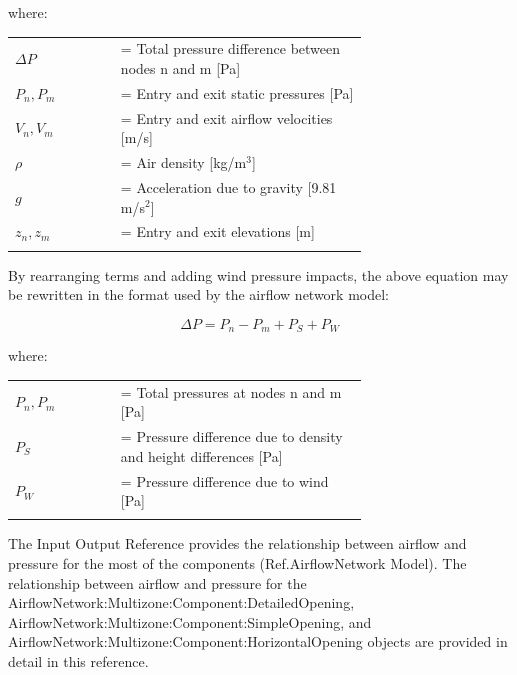 where:

\begin{tabular}{lp{0.7\linewidth}}
\\
$\Delta P$ &= Total pressure difference between nodes n and m [Pa] \\
$P_n, P_m$ &= Entry and exit static pressures [Pa] \\
$V_n, V_m$ &= Entry and exit airflow velocities [m/s] \\
$\rho$ &= Air density [kg/m\(^{3}\)] \\
$g$ &= Acceleration due to gravity [9.81 m/s\(^{2}\)] \\
$z_n, z_m$ &= Entry and exit elevations [m] \\
\\
\end{tabular}


By rearranging terms and adding wind pressure impacts, the above equation may be rewritten in the format used by the airflow network model:

\begin{equation}
\Delta P = {P_n} - {P_m} + {P_S} + {P_W}
\end{equation}

where:

\begin{tabular}{lp{0.7\linewidth}}
\\
$P_n, P_m$ &= Total pressures at nodes n and m [Pa] \\
$P_S$ &= Pressure difference due to density and height differences [Pa] \\
$P_W$ &= Pressure difference due to wind [Pa] \\
\\
\end{tabular}

The Input Output Reference provides the relationship between airflow and pressure for the most of the components (Ref.AirflowNetwork Model). The relationship between airflow and pressure for the AirflowNetwork:Multizone:Component:DetailedOpening, AirflowNetwork:Multizone:Component:SimpleOpening, and Air\-flow\-Net\-work:\-Multi\-zone:\-Com\-ponent:\-Horizontal\-Opening objects are provided in detail in this reference.

